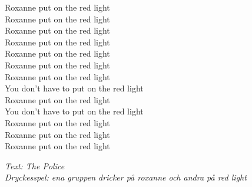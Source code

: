 Roxanne put on the red light\\
Roxanne put on the red light\\
Roxanne put on the red light\\
Roxanne put on the red light\\
Roxanne put on the red light\\
Roxanne put on the red light\\
Roxanne put on the red light\\
You don't have to put on the red light\\
Roxanne put on the red light\\
You don't have to put on the red light\\
Roxanne put on the red light\\
Roxanne put on the red light\\
Roxanne put on the red light
\par
\vspace{10pt}
{\footnotesize\textit{Text: The Police\\ Dryckesspel: ena gruppen dricker på roxanne och andra på red light}}
